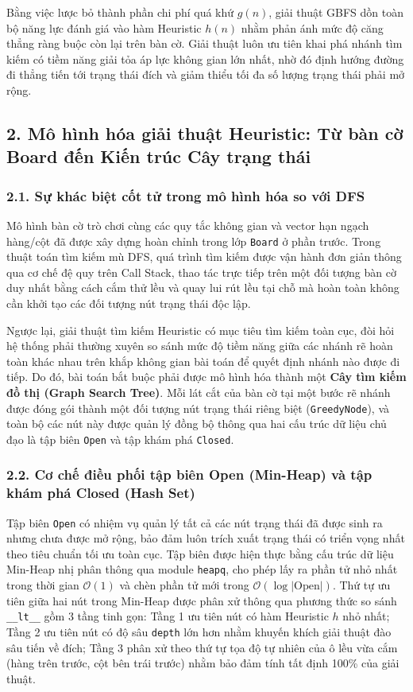 \documentclass[a4paper,12pt]{article}
\begin{document}
Bằng việc lược bỏ thành phần chi phí quá khứ $g(n)$, giải thuật GBFS dồn toàn bộ năng lực đánh giá vào hàm Heuristic $h(n)$ nhằm phản ánh mức độ căng thẳng ràng buộc còn lại trên bàn cờ. Giải thuật luôn ưu tiên khai phá nhánh tìm kiếm có tiềm năng giải tỏa áp lực không gian lớn nhất, nhờ đó định hướng đường đi thẳng tiến tới trạng thái đích và giảm thiểu tối đa số lượng trạng thái phải mở rộng.

\subsection*{2. Mô hình hóa giải thuật Heuristic: Từ bàn cờ Board đến Kiến trúc Cây trạng thái}

\subsubsection*{2.1. Sự khác biệt cốt tử trong mô hình hóa so với DFS}
Mô hình bàn cờ trò chơi cùng các quy tắc không gian và vector hạn ngạch hàng/cột đã được xây dựng hoàn chỉnh trong lớp \texttt{Board} ở phần trước. Trong thuật toán tìm kiếm mù DFS, quá trình tìm kiếm được vận hành đơn giản thông qua cơ chế đệ quy trên Call Stack, thao tác trực tiếp trên một đối tượng bàn cờ duy nhất bằng cách cắm thử lều và quay lui rút lều tại chỗ mà hoàn toàn không cần khởi tạo các đối tượng nút trạng thái độc lập.

Ngược lại, giải thuật tìm kiếm Heuristic có mục tiêu tìm kiếm toàn cục, đòi hỏi hệ thống phải thường xuyên so sánh mức độ tiềm năng giữa các nhánh rẽ hoàn toàn khác nhau trên khắp không gian bài toán để quyết định nhánh nào được đi tiếp. Do đó, bài toán bắt buộc phải được mô hình hóa thành một \textbf{Cây tìm kiếm đồ thị (Graph Search Tree)}. Mỗi lát cắt của bàn cờ tại một bước rẽ nhánh được đóng gói thành một đối tượng nút trạng thái riêng biệt (\texttt{GreedyNode}), và toàn bộ các nút này được quản lý đồng bộ thông qua hai cấu trúc dữ liệu chủ đạo là tập biên \texttt{Open} và tập khám phá \texttt{Closed}.

\subsubsection*{2.2. Cơ chế điều phối tập biên Open (Min-Heap) và tập khám phá Closed (Hash Set)}
Tập biên \texttt{Open} có nhiệm vụ quản lý tất cả các nút trạng thái đã được sinh ra nhưng chưa được mở rộng, bảo đảm luôn trích xuất trạng thái có triển vọng nhất theo tiêu chuẩn tối ưu toàn cục. Tập biên được hiện thực bằng cấu trúc dữ liệu Min-Heap nhị phân thông qua module \texttt{heapq}, cho phép lấy ra phần tử nhỏ nhất trong thời gian $\mathcal{O}(1)$ và chèn phần tử mới trong $\mathcal{O}(\log |\text{Open}|)$. Thứ tự ưu tiên giữa hai nút trong Min-Heap được phân xử thông qua phương thức so sánh \texttt{\_\_lt\_\_} gồm 3 tầng tinh gọn: Tầng 1 ưu tiên nút có hàm Heuristic $h$ nhỏ nhất; Tầng 2 ưu tiên nút có độ sâu \texttt{depth} lớn hơn nhằm khuyến khích giải thuật đào sâu tiến về đích; Tầng 3 phân xử theo thứ tự tọa độ tự nhiên của ô lều vừa cắm (hàng trên trước, cột bên trái trước) nhằm bảo đảm tính tất định 100\% của giải thuật.
\end{document}

